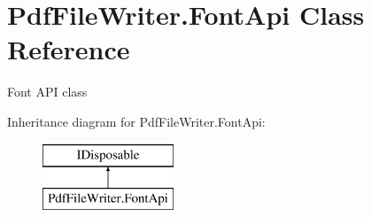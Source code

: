 \hypertarget{class_pdf_file_writer_1_1_font_api}{}\section{Pdf\+File\+Writer.\+Font\+Api Class Reference}
\label{class_pdf_file_writer_1_1_font_api}


Font A\+PI class  


Inheritance diagram for Pdf\+File\+Writer.\+Font\+Api\+:\begin{figure}[H]
\begin{center}
\leavevmode
\includegraphics[height=2.000000cm]{class_pdf_file_writer_1_1_font_api}
\end{center}
\end{figure}
